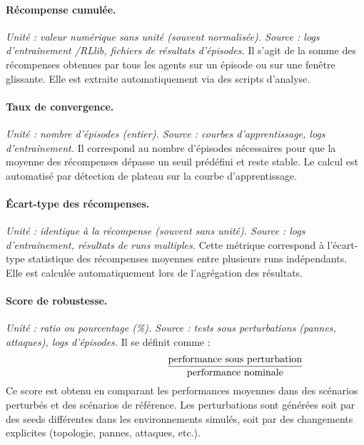 \paragraph{Récompense cumulée.}
\textit{Unité : valeur numérique sans unité (souvent normalisée). Source : logs d'entraînement /RLlib, fichiers de résultats d'épisodes.}
Il s'agit de la somme des récompenses obtenues par tous les agents sur un épisode ou sur une fenêtre glissante.
Elle est extraite automatiquement via des scripts d'analyse.

\paragraph{Taux de convergence.}
\textit{Unité : nombre d'épisodes (entier). Source : courbes d'apprentissage, logs d'entraînement.}
Il correspond au nombre d'épisodes nécessaires pour que la moyenne des récompenses dépasse un seuil prédéfini et reste stable.
Le calcul est automatisé par détection de plateau sur la courbe d'apprentissage.

\paragraph{Écart-type des récompenses.}
\textit{Unité : identique à la récompense (souvent sans unité). Source : logs d'entraînement, résultats de runs multiples.}
Cette métrique correspond à l'écart-type statistique des récompenses moyennes entre plusieurs runs indépendants.
Elle est calculée automatiquement lors de l'agrégation des résultats.

\paragraph{Score de robustesse.}
\textit{Unité : ratio ou pourcentage (\%). Source : tests sous perturbations (pannes, attaques), logs d'épisodes.}
Il se définit comme :
\[
  \hspace{3.5cm}\frac{\text{performance sous perturbation}}{\text{performance nominale}}
\]
Ce score est obtenu en comparant les performances moyennes dans des scénarios perturbés et des scénarios de référence.
Les perturbations sont générées soit par des seeds différentes dans les environnements simulés, soit par des changements explicites (topologie, pannes, attaques, etc.).

